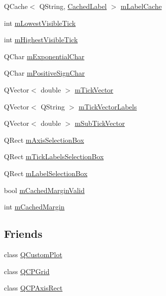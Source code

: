 \begin{DoxyCompactItemize}
Q\-Cache$<$ Q\-String, \hyperlink{struct_q_c_p_axis_1_1_cached_label}{Cached\-Label} $>$ \hyperlink{class_q_c_p_axis_a0182a6e7505b3eeef63a019fa1d56388}{m\-Label\-Cache}
\item 
int \hyperlink{class_q_c_p_axis_aebb24ba8734b7e054efc6e1ecc5414c7}{m\-Lowest\-Visible\-Tick}
\item 
int \hyperlink{class_q_c_p_axis_abb3b3ccce7e9779fef2be91ce1a46ef0}{m\-Highest\-Visible\-Tick}
\item 
Q\-Char \hyperlink{class_q_c_p_axis_a0ec9dbb79704be01f780d34c6f57a08e}{m\-Exponential\-Char}
\item 
Q\-Char \hyperlink{class_q_c_p_axis_ae99d47103ec8ba66959205b23991241b}{m\-Positive\-Sign\-Char}
\item 
Q\-Vector$<$ double $>$ \hyperlink{class_q_c_p_axis_aae0f9b9973b85be601200f00f5825087}{m\-Tick\-Vector}
\item 
Q\-Vector$<$ Q\-String $>$ \hyperlink{class_q_c_p_axis_aeee4bd0fca3f587eafe33843d1cb4f82}{m\-Tick\-Vector\-Labels}
\item 
Q\-Vector$<$ double $>$ \hyperlink{class_q_c_p_axis_a28353081e0ff35c3fe5ced923a287faa}{m\-Sub\-Tick\-Vector}
\item 
Q\-Rect \hyperlink{class_q_c_p_axis_a6185814615059cacf09fdb74a3e539d7}{m\-Axis\-Selection\-Box}
\item 
Q\-Rect \hyperlink{class_q_c_p_axis_acca7a38191c1f4df06b9416d43172214}{m\-Tick\-Labels\-Selection\-Box}
\item 
Q\-Rect \hyperlink{class_q_c_p_axis_a14fbf65daf2c38cbb0f2c4278a7929dd}{m\-Label\-Selection\-Box}
\item 
bool \hyperlink{class_q_c_p_axis_a2cde37b6e385f47e11322df4ac1b0e9b}{m\-Cached\-Margin\-Valid}
\item 
int \hyperlink{class_q_c_p_axis_a48ace55cbd54f7241e7f1b06fd369b64}{m\-Cached\-Margin}
\end{DoxyCompactItemize}
\subsection*{Friends}
\begin{DoxyCompactItemize}
\item 
class \hyperlink{class_q_c_p_axis_a1cdf9df76adcfae45261690aa0ca2198}{Q\-Custom\-Plot}
\item 
class \hyperlink{class_q_c_p_axis_a061e177f585549fc31f780852e2bd6fe}{Q\-C\-P\-Grid}
\item 
class \hyperlink{class_q_c_p_axis_acbf20ecb140f66c5fd1bc64ae0762990}{Q\-C\-P\-Axis\-Rect}
\end{DoxyCompactItemize}


